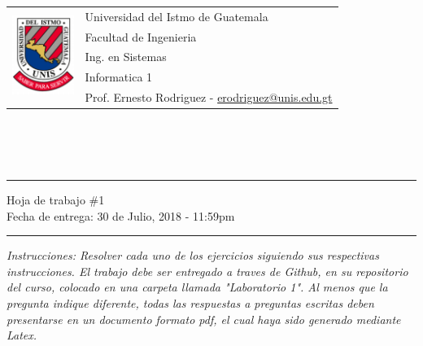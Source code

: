 \documentclass{article}
\newcommand{\horrule}[1]{\rule{\linewidth}{#1}}
\newcommand{\perlscript}[2]{
\begin{itemize}
\item[]
\end{itemize}
}
\begin{document}
\begin{tabular}{l l}
\multirow{5}{*}{\includegraphics[width=2cm]{../../recursos/logo.png}} & Universidad del Istmo de Guatemala \\
 & Facultad de Ingenieria \\
 & Ing. en Sistemas \\
 & Informatica 1 \\
 & Prof. Ernesto Rodriguez - \href{mailto:erodriguez@unis.edu.gt}{erodriguez@unis.edu.gt} \\
\end{tabular}
\\\\\\

\begin{center}
        \horrule{0.5pt}
        \huge{Hoja de trabajo \#1} \\
        \large{Fecha de entrega: 30 de Julio, 2018 - 11:59pm} \\
        \horrule{1pt}
\end{center}

\emph{Instrucciones: Resolver cada uno de los ejercicios siguiendo sus respectivas
instrucciones. El trabajo debe ser entregado a traves de Github, en su repositorio del curso, colocado en una carpeta llamada "Laboratorio 1".
Al menos que la pregunta indique diferente, todas las respuestas a preguntas escritas deben presentarse en
un documento formato pdf, el cual haya sido generado mediante Latex. }

\end{document}
